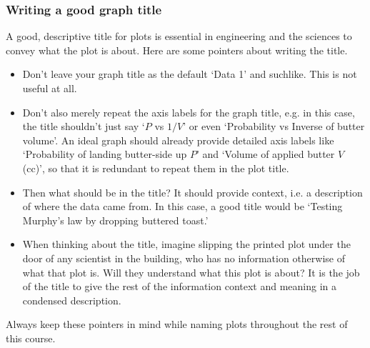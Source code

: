 \subsubsection{Writing a good graph title}%
A good, descriptive title for plots is essential in engineering and the sciences to convey what the plot is about. Here are some pointers about writing the title.
\begin{itemize}
\item Don't leave your graph title as the default `Data 1' and suchlike. This is not useful at all.
\item Don't also merely repeat the axis labels for the graph title, e.g. in this case, the title shouldn't just say `$P$ vs $1/V$' or even `Probability vs Inverse of butter volume'. An ideal graph should already provide detailed axis labels like `Probability of landing butter-side up $P$' and `Volume of applied butter $V$ (cc)', so that it is redundant to repeat them in the plot title.
\item Then what should be in the title? It should provide context, i.e. a description of where the data came from. In this case, a good title would be `Testing Murphy's law by dropping buttered toast.'
\item When thinking about the title, imagine slipping the printed plot under the door of any scientist in the building, who has no information otherwise of what that plot is. Will they understand what this plot is about? It is the job of the title to give the rest of the information context and meaning in a condensed description.
\end{itemize}
Always keep these pointers in mind while naming plots throughout the rest of this course.

